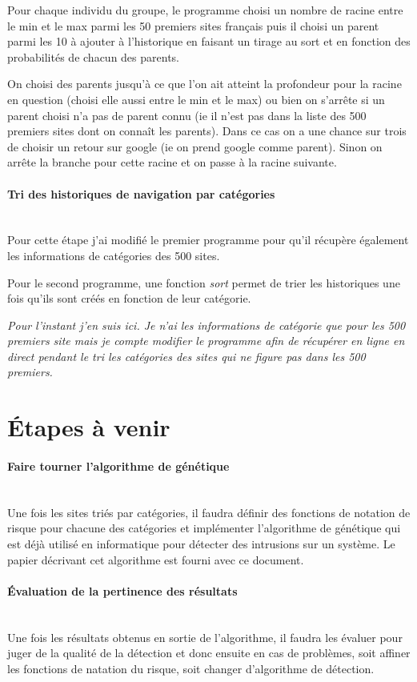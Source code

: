 \documentclass[10pt]{article}
\begin{document}
Pour chaque individu du groupe, le programme choisi un nombre de racine entre le min et le max parmi les 50 premiers sites français puis il choisi un parent parmi les 10 à ajouter à l'historique en faisant un tirage au sort et en fonction des probabilités de chacun des parents.

On choisi des parents jusqu'à ce que l'on ait atteint la profondeur pour la racine en question (choisi elle aussi entre le min et le max) ou bien on s'arrête si un parent choisi n'a pas de parent connu (ie il n'est pas dans la liste des 500 premiers sites dont on connaît les parents). Dans ce cas on a une chance sur trois de choisir un retour sur google (ie on prend google comme parent). Sinon on arrête la branche pour cette racine et on passe à la racine suivante.

\paragraph{Tri des historiques de navigation par catégories}~\\
Pour cette étape j'ai modifié le premier programme pour qu'il récupère également les informations de catégories des 500 sites.

Pour le second programme, une fonction \emph{sort} permet de trier les historiques une fois qu'ils sont créés en fonction de leur catégorie.

\emph{Pour l'instant j'en suis ici. Je n'ai les informations de catégorie que pour les 500 premiers site mais je compte modifier le programme afin de récupérer en ligne en direct pendant le tri les catégories des sites qui ne figure pas dans les 500 premiers.}

\section{Étapes à venir}

\paragraph{Faire tourner l'algorithme de génétique}~\\
Une fois les sites triés par catégories, il faudra définir des fonctions de notation de risque pour chacune des catégories et implémenter l'algorithme de génétique qui est déjà utilisé en informatique pour détecter des intrusions sur un système. Le papier décrivant cet algorithme est fourni avec ce document.

\paragraph{Évaluation de la pertinence des résultats}~\\
Une fois les résultats obtenus en sortie de l'algorithme, il faudra les évaluer pour juger de la qualité de la détection et donc ensuite en cas de problèmes, soit affiner les fonctions  de natation du risque, soit changer d'algorithme de détection.
\end{document}
